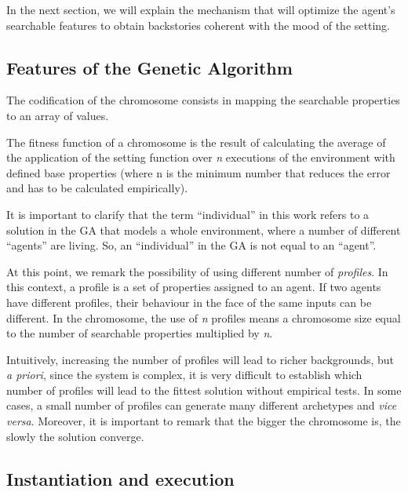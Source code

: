 \documentclass[letterpaper]{article}
\begin{document}
In the next section, we will explain the mechanism that will optimize the agent's searchable features to obtain backstories coherent with the mood of the setting.

\subsection{Features of the Genetic Algorithm}


The codification of the chromosome consists in mapping the searchable properties to an array of values. %

The fitness function of a chromosome is the result of calculating the average of the application of the setting function over \textit{n} executions of the environment with defined base properties (where n is the minimum number that reduces the error and has to be calculated empirically).

It is important to clarify that the term ``individual'' in this work refers to a solution in the GA that models a whole environment, where a number of different ``agents'' are living. So, an ``individual'' in the GA is not equal to an ``agent''.  


At this point, we remark the possibility of using different number of {\em profiles}. In this context, a profile is a set of properties assigned to an agent. If two agents have different profiles, their behaviour in the face of the same inputs can be different. In the chromosome, the use of \textit{n} profiles means a chromosome size equal to the number of searchable properties multiplied by \textit{n}.

Intuitively, increasing the number of profiles will lead to richer backgrounds, but \textit{a priori}, since the system is complex, it is very difficult to establish which number of profiles will lead to the fittest solution without empirical tests. In some cases, a small number of profiles can generate many different archetypes and \textit{vice versa}. Moreover, it is important to remark that the bigger the chromosome is, the slowly the solution converge.


\subsection{Instantiation and execution}
\end{document}
